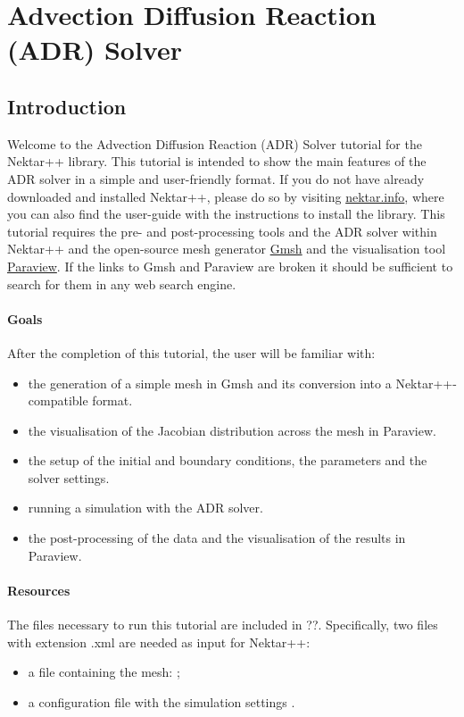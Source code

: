\chapter{Advection Diffusion Reaction (ADR) Solver}
\label{ADR}

\section*{\Large Introduction}
Welcome to the Advection Diffusion Reaction (ADR) Solver tutorial for the Nektar++ library.
This tutorial is intended to show the main features of the ADR solver in a simple and user-friendly 
format. If you do not have already downloaded and installed Nektar++, please do so by visiting 
\href{http://www.nektar.info}{nektar.info}, where you can also find the user-guide with the instructions 
to install the library. This tutorial requires the pre- and post-processing tools and the ADR 
solver within Nektar++ and the open-source mesh generator \href{http://geuz.org/gmsh/}{Gmsh} 
and the visualisation tool \href{http://www.paraview.org}{Paraview}. If the links to Gmsh and Paraview 
are broken it should be sufficient to search for them in any web search engine.  


\subsubsection*{Goals}
After the completion of this tutorial, the user will be familiar with:
\vspace{-0.5cm}
\begin{itemize}
\item the generation of a simple mesh in Gmsh and its conversion into a Nektar++-compatible format.
\item the visualisation of the Jacobian distribution across the mesh in Paraview.
\item the setup of the initial and boundary conditions, the parameters and the solver settings.
\item running a simulation with the ADR solver.
\item the post-processing of the data and the visualisation of the results in Paraview.
\end{itemize}

\subsubsection*{Resources}
The files necessary to run this tutorial are included in ??.  
Specifically, two files with extension \textsf{.xml} are needed as input for Nektar++: 
\vspace{-0.5cm}
\begin{itemize}
\item a file containing the mesh: ;
\item a configuration file with the simulation settings .
\end{itemize}

